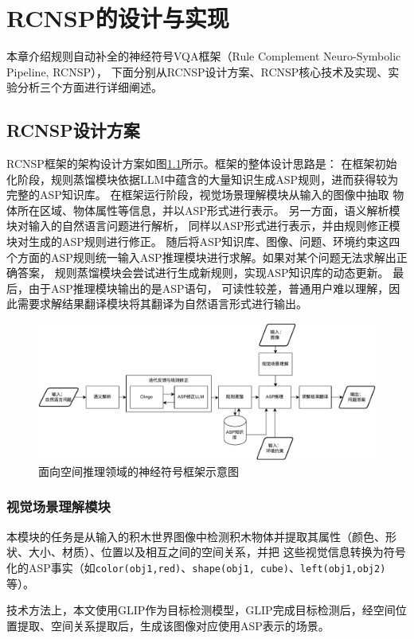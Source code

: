 \chapter{RCNSP的设计与实现}
本章介绍规则自动补全的神经符号VQA框架（Rule Complement Neuro-Symbolic Pipeline, RCNSP），
下面分别从RCNSP设计方案、RCNSP核心技术及实现、实验分析三个方面进行详细阐述。
\section{RCNSP设计方案}
RCNSP框架的架构设计方案如图\ref{fig:pipeline}所示。框架的整体设计思路是：
在框架初始化阶段，规则蒸馏模块依据LLM中蕴含的大量知识生成ASP规则，进而获得较为完整的ASP知识库。
在框架运行阶段，视觉场景理解模块从输入的图像中抽取
物体所在区域、物体属性等信息，并以ASP形式进行表示。
另一方面，语义解析模块对输入的自然语言问题进行解析，
同样以ASP形式进行表示，并由规则修正模块对生成的ASP规则进行修正。
随后将ASP知识库、图像、问题、环境约束这四个方面的ASP规则统一输入ASP推理模块进行求解。如果对某个问题无法求解出正确答案，
规则蒸馏模块会尝试进行生成新规则，实现ASP知识库的动态更新。
最后，由于ASP推理模块输出的是ASP语句，
可读性较差，普通用户难以理解，因此需要求解结果翻译模块将其翻译为自然语言形式进行输出。
\begin{figure}[h]
    \centering
    \includegraphics[width=\textwidth]{figures/pipeline-crop.pdf}
    \caption{面向空间推理领域的神经符号框架示意图}
    \label{fig:pipeline}
\end{figure}
\subsection{视觉场景理解模块}
本模块的任务是从输入的积木世界图像中检测积木物体并提取其属性（颜色、形状、大小、材质）、位置以及相互之间的空间关系，并把
这些视觉信息转换为符号化的ASP事实（如\texttt{color(obj1,red)}、\texttt{shape(obj1, cube)}、\texttt{left(obj1,obj2)}等）。

技术方法上，本文使用GLIP作为目标检测模型，GLIP完成目标检测后，经空间位置提取、空间关系提取后，生成该图像对应使用ASP表示的场景。

